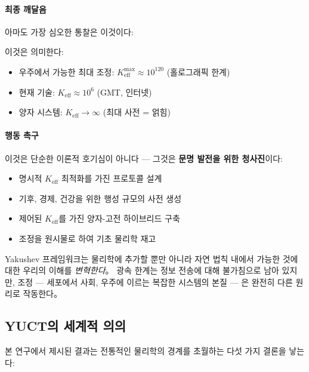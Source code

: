 \documentclass[11pt,a4paper]{article}
\begin{document}
\paragraph{최종 깨달음}
아마도 가장 심오한 통찰은 이것이다:

\begin{center}
\end{center}

이것은 의미한다:
\begin{itemize}
\item 우주에서 가능한 최대 조정: $K_{\mathrm{eff}}^{\max} \approx 10^{120}$ (홀로그래픽 한계)
\item 현재 기술: $K_{\mathrm{eff}} \approx 10^6$ (GMT, 인터넷)
\item 양자 시스템: $K_{\mathrm{eff}} \to \infty$ (최대 사전 = 얽힘)
\end{itemize}

\paragraph{행동 촉구}
이것은 단순한 이론적 호기심이 아니다 — 그것은 \textbf{문명 발전을 위한 청사진}이다:

\begin{itemize}
\item 명시적 $K_{\mathrm{eff}}$ 최적화를 가진 프로토콜 설계
\item 기후, 경제, 건강을 위한 행성 규모의 사전 생성
\item 제어된 $K_{\mathrm{eff}}$를 가진 양자-고전 하이브리드 구축
\item 조정을 원시물로 하여 기초 물리학 재고
\end{itemize}

Yakushev 프레임워크는 물리학에 추가할 뿐만 아니라 자연 법칙 내에서 가능한 것에 대한 우리의 이해를 \emph{변혁한다}。 광속 한계는 정보 전송에 대해 불가침으로 남아 있지만, 조정 — 세포에서 사회, 우주에 이르는 복잡한 시스템의 본질 — 은 완전히 다른 원리로 작동한다。

\subsection{YUCT의 세계적 의의}

본 연구에서 제시된 결과는 전통적인 물리학의 경계를 초월하는 다섯 가지 결론을 낳는다:
\end{document}

